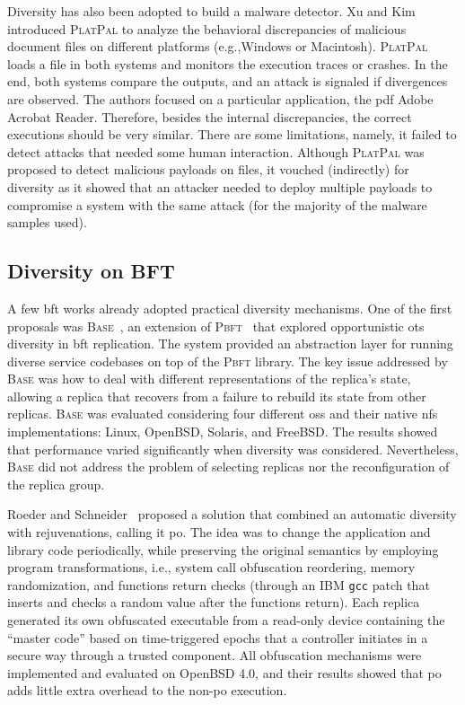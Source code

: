 Diversity has also been adopted to build a malware detector. 
Xu and Kim~\cite{Xu:2017a} introduced \textsc{PlatPal} to analyze the behavioral discrepancies of malicious document files on different platforms (e.g.,Windows or Macintosh).
\textsc{PlatPal} loads a file in both systems and monitors the execution traces or crashes. 
In the end, both systems compare the outputs, and an attack is signaled if divergences are observed.
The authors focused on a particular application, the pdf Adobe Acrobat Reader.
Therefore, besides the internal discrepancies, the correct executions should be very similar.
There are some limitations, namely, it failed to detect attacks that needed some human interaction.
Although \textsc{PlatPal} was proposed to detect malicious payloads on files, it vouched (indirectly) for diversity as it showed that an attacker needed to deploy multiple payloads to compromise a system with the same attack (for the majority of the malware samples used).

\subsection{Diversity on BFT}
A few \gls{bft} works already adopted practical diversity mechanisms. 
One of the first proposals was \textsc{Base}~\cite{Castro:2003}, an extension of \textsc{Pbft}~\cite{Castro:1999} that explored opportunistic \gls{ots} diversity in \gls{bft} replication.
The system provided an abstraction layer for running diverse service codebases on top of the \textsc{Pbft} library.
The key issue addressed by \textsc{Base} was how to deal with different representations of the replica's state, allowing a replica that recovers from a failure to rebuild its state from other replicas. 
\textsc{Base} was evaluated considering four different \glspl{os} and their native \gls{nfs} implementations: Linux, OpenBSD, Solaris, and FreeBSD.
The results showed that performance varied significantly when diversity was considered.
Nevertheless, \textsc{Base} did not address the problem of selecting replicas nor the reconfiguration of the replica group.

Roeder and Schneider~\cite{Roeder:2010} proposed a solution that combined an automatic diversity with rejuvenations, calling it \gls{po}.
The idea was to change the application and library code periodically, while preserving the original semantics by employing program transformations, i.e., system call obfuscation reordering, memory randomization, and functions return checks (through an IBM \texttt{gcc} patch that inserts and checks a random value after the functions return).
Each replica generated its own obfuscated executable from a read-only device containing the ``master code'' based on time-triggered epochs that a controller initiates in a secure way through a trusted component.
All obfuscation mechanisms were implemented and evaluated on OpenBSD 4.0, and their results showed that \gls{po} adds little extra overhead to the non-\gls{po} execution.

